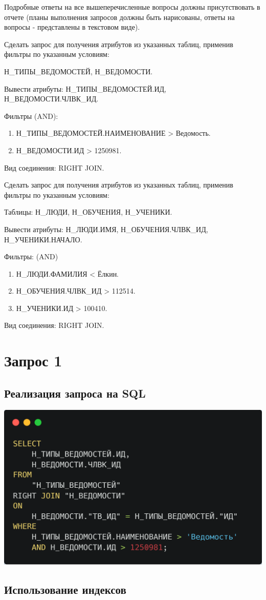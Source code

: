 \documentclass[12pt]{article}
\begin{document}
	Подробные ответы на все вышеперечисленные вопросы должны присутствовать в отчете (планы выполнения запросов должны быть нарисованы, ответы на вопросы - представлены в текстовом виде).
	
	Сделать запрос для получения атрибутов из указанных таблиц, применив фильтры по указанным условиям:
	
	Н_ТИПЫ_ВЕДОМОСТЕЙ, Н_ВЕДОМОСТИ.
	
	Вывести атрибуты: Н_ТИПЫ_ВЕДОМОСТЕЙ.ИД, Н_ВЕДОМОСТИ.ЧЛВК_ИД.
	
	Фильтры (AND):
	\begin{enumerate}[]
	\item Н_ТИПЫ_ВЕДОМОСТЕЙ.НАИМЕНОВАНИЕ > Ведомость.
	\item Н_ВЕДОМОСТИ.ИД > 1250981.
	\end{enumerate}
	Вид соединения: RIGHT JOIN.
	
	Сделать запрос для получения атрибутов из указанных таблиц, применив фильтры по указанным условиям:
	
	Таблицы: Н_ЛЮДИ, Н_ОБУЧЕНИЯ, Н_УЧЕНИКИ.
	
	Вывести атрибуты: Н_ЛЮДИ.ИМЯ, Н_ОБУЧЕНИЯ.ЧЛВК_ИД, Н_УЧЕНИКИ.НАЧАЛО.
	
	Фильтры: (AND)
	\begin{enumerate}[]
	\item Н_ЛЮДИ.ФАМИЛИЯ < Ёлкин.
	\item Н_ОБУЧЕНИЯ.ЧЛВК_ИД > 112514.
	\item Н_УЧЕНИКИ.ИД > 100410.
	\end{enumerate}
	Вид соединения: RIGHT JOIN.
	\newpage
	
	\section{Запрос 1}
	\subsection{Реализация запроса на SQL}
	\includegraphics[width=0.5\linewidth]{sql1}
	\subsection{Использование индексов}
\end{document}

